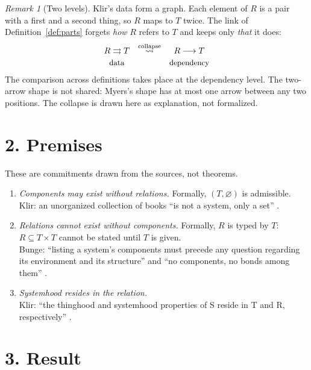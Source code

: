 \documentclass[10pt]{article}
\theoremstyle{definition}
\theoremstyle{remark}
\newtheorem*{remark}{Remark}
\begin{document}
\begin{remark}[Two levels]
Klir's data form a graph. Each element of $R$ is a pair with a first and a second thing, so $R$ maps to $T$ twice. The link of Definition~\ref{def:parts} forgets \emph{how} $R$ refers to $T$ and keeps only \emph{that} it does:
\[
\begin{array}{ccc}
  R \rightrightarrows T & \overset{\text{collapse}}{\rightsquigarrow} & R \longrightarrow T \\[0.2em]
  \text{\small data} & & \text{\small dependency}
\end{array}
\]
The comparison across definitions takes place at the dependency level. The two-arrow shape is not shared: Myers's shape has at most one arrow between any two positions. The collapse is drawn here as explanation, not formalized.
\end{remark}

\section*{2. Premises}

These are commitments drawn from the sources, not theorems.

\begin{enumerate}[label=\textbf{(P\arabic*)}, leftmargin=2.6em, itemsep=0.35em]
  \item \emph{Components may exist without relations.} Formally, $(T, \varnothing)$ is admissible.\\
  {\small Klir: an unorganized collection of books ``is not a system, only a set'' \cite[p.~5]{klir}.}
  \item \emph{Relations cannot exist without components.} Formally, $R$ is typed by $T$: $R \subseteq T \times T$ cannot be stated until $T$ is given.\\
  {\small Bunge: ``listing a system's components must precede any question regarding its environment and its structure'' and ``no components, no bonds among them'' \cite[pp.~43--44]{bunge}.}
  \item \emph{Systemhood resides in the relation.}\\
  {\small Klir: ``the thinghood and systemhood properties of S reside in T and R, respectively'' \cite[p.~5]{klir}.}
\end{enumerate}

\section*{3. Result}
\end{document}
